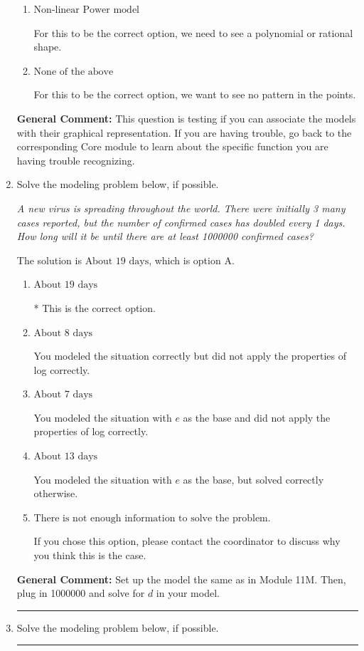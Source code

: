 \documentclass{extbook}[14pt]
\newcommand{\litem}[1]{\item #1

\rule{\textwidth}{0.4pt}}
\begin{document}
\begin{enumerate}
{\begin{enumerate}[label=\Alph*.]
For this to be the correct option, we want a rapid change early, then an extremely slow change later.
\item \( \text{Non-linear Power model} \)

For this to be the correct option, we need to see a polynomial or rational shape.
\item \( \text{None of the above} \)

For this to be the correct option, we want to see no pattern in the points.
\end{enumerate}

\textbf{General Comment:} This question is testing if you can associate the models with their graphical representation. If you are having trouble, go back to the corresponding Core module to learn about the specific function you are having trouble recognizing.
}
\litem{
Solve the modeling problem below, if possible.

\begin{center}
    \textit{ A new virus is spreading throughout the world. There were initially 3 many cases reported, but the number of confirmed cases has doubled every 1 days. How long will it be until there are at least 1000000 confirmed cases? }
\end{center}
The solution is \( \text{About } 19 \text{ days} \), which is option A.\begin{enumerate}[label=\Alph*.]
\item \( \text{About } 19 \text{ days} \)

* This is the correct option.
\item \( \text{About } 8 \text{ days} \)

You modeled the situation correctly but did not apply the properties of log correctly.
\item \( \text{About } 7 \text{ days} \)

You modeled the situation with $e$ as the base and did not apply the properties of log correctly.
\item \( \text{About } 13 \text{ days} \)

You modeled the situation with $e$ as the base, but solved correctly otherwise.
\item \( \text{There is not enough information to solve the problem.} \)

If you chose this option, please contact the coordinator to discuss why you think this is the case.
\end{enumerate}

\textbf{General Comment:} Set up the model the same as in Module 11M. Then, plug in 1000000 and solve for $d$ in your model.
}
\litem{
Solve the modeling problem below, if possible.

}
\end{enumerate}
\end{document}
